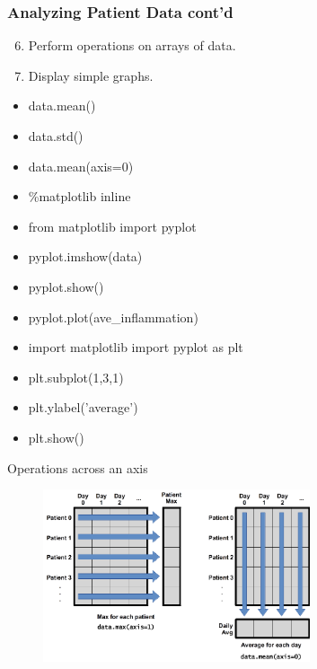 \documentclass{beamer}
\begin{document}
\begin{frame}
\frametitle{Analyzing Patient Data cont'd}
\begin{enumerate}
\setcounter{enumi}{5}
\item    Perform operations on arrays of data.
\item    Display simple graphs.
\end{enumerate}
\begin{multicols}{2}
\begin{itemize}
\item data.mean()
\item data.std()
\item data.mean(axis=0)
\item \%matplotlib inline
\item from matplotlib import pyplot
\item pyplot.imshow(data)
\item pyplot.show()
\item pyplot.plot(ave\_inflammation)
\item import matplotlib import pyplot as plt
\item plt.subplot(1,3,1)
\item plt.ylabel('average')
\item plt.show()
\end{itemize}
\end{multicols}
\end{frame}





\begin{frame}{Operations across an axis}

\begin{figure}[htbp]
   \centering
  \includegraphics[width=0.7\textwidth]{figs_slides/python-operations-across-axes.png}
\end{figure}

\end{frame}
\end{document}
